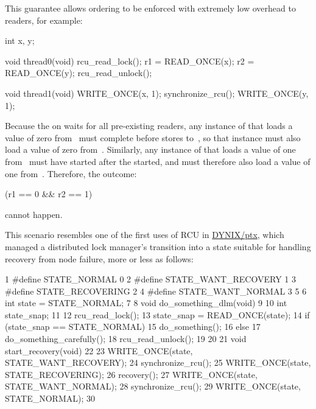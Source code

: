 This guarantee allows ordering to be enforced with extremely low
overhead to readers, for example:

\begin{VerbatimN}
	int x, y;

	void thread0(void)
	{
		rcu_read_lock();
		r1 = READ_ONCE(x);
		r2 = READ_ONCE(y);
		rcu_read_unlock();
	}

	void thread1(void)
	{
		WRITE_ONCE(x, 1);
		synchronize_rcu();
		WRITE_ONCE(y, 1);
	}
\end{VerbatimN}

Because the  on \clnref{} %
waits for all pre-existing
readers, any instance of  that loads a value of zero
from~ must complete before  stores to~, so that
instance must also load a value of zero from~.
Similarly, any
instance of  that loads a value of one from~ must have
started after the  started, and must therefore also
load a value of one from~.
Therefore, the outcome:

\begin{VerbatimU}
	(r1 == 0 && r2 == 1)
\end{VerbatimU}

\noindent%
cannot happen.

\QuickQuizEnd

This scenario resembles one of the first uses of RCU in
\href{https://en.wikipedia.org/wiki/DYNIX}{DYNIX/ptx}, which managed a
distributed lock manager's transition into a state suitable for handling
recovery from node failure, more or less as follows:

\begin{VerbatimN}
       1 #define STATE_NORMAL        0
       2 #define STATE_WANT_RECOVERY 1
       3 #define STATE_RECOVERING    2
       4 #define STATE_WANT_NORMAL   3
       5
       6 int state = STATE_NORMAL;
       7
       8 void do_something_dlm(void)
       9 {
      10   int state_snap;
      11
      12   rcu_read_lock();
      13   state_snap = READ_ONCE(state);
      14   if (state_snap == STATE_NORMAL)
      15     do_something();
      16   else
      17     do_something_carefully();
      18   rcu_read_unlock();
      19 }
      20
      21 void start_recovery(void)
      22 {
      23   WRITE_ONCE(state, STATE_WANT_RECOVERY);
      24   synchronize_rcu();
      25   WRITE_ONCE(state, STATE_RECOVERING);
      26   recovery();
      27   WRITE_ONCE(state, STATE_WANT_NORMAL);
      28   synchronize_rcu();
      29   WRITE_ONCE(state, STATE_NORMAL);
      30 }
\end{VerbatimN}

